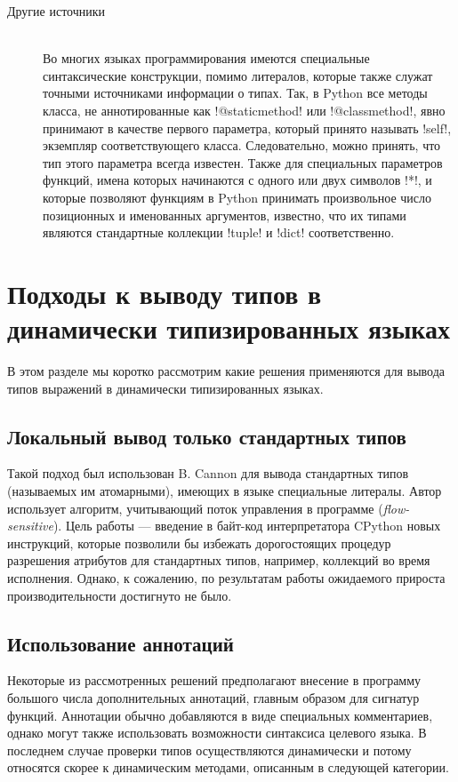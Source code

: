 \begin{description}
    \item[Другие источники] \hfill \\
        Во многих языках программирования имеются специальные синтаксические
        конструкции, помимо литералов, которые также служат точными источниками
        информации о типах. Так, в Python все методы класса, не аннотированные
        как !@staticmethod! или !@classmethod!, явно принимают в качестве первого
        параметра, который принято называть !self!, экземпляр соответствующего
        класса. Следовательно, можно принять, что тип этого параметра всегда
        известен.  Также для специальных параметров функций, имена которых
        начинаются с одного или двух символов !*!, и которые позволяют функциям в
        Python принимать произвольное число позиционных и именованных аргументов,
        известно, что их типами являются стандартные коллекции !tuple! и !dict!
        соответственно.

\end{description}
     
\section{Подходы к выводу типов в динамически типизированных языках}

В этом разделе мы коротко рассмотрим какие решения применяются для вывода
типов выражений в динамически типизированных языках.

\subsection{Локальный вывод только стандартных типов}

Такой подход был использован B. Cannon для вывода стандартных типов (называемых им
атомарными), имеющих в языке специальные литералы. Автор использует алгоритм,
учитывающий поток управления в программе (\emph{flow-sensitive}). Цель работы
--- введение в байт-код интерпретатора CPython новых инструкций, которые
позволили бы избежать дорогостоящих процедур разрешения атрибутов для
стандартных типов, например, коллекций во время исполнения. Однако, к сожалению,
по результатам работы ожидаемого прироста производительности достигнуто не было.

\subsection{Использование аннотаций}

Некоторые из рассмотренных решений предполагают внесение в программу большого
числа дополнительных аннотаций, главным образом для сигнатур функций. Аннотации
обычно добавляются в виде специальных комментариев, однако могут также
использовать возможности синтаксиса целевого языка. В последнем случае проверки
типов осуществляются динамически и потому относятся скорее к динамическим
методами, описанным в следующей категории.

